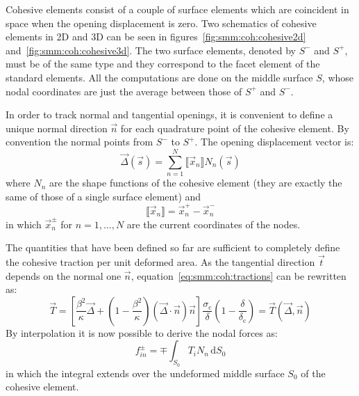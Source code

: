 Cohesive elements consist of a couple of surface elements which are
coincident in space when the opening displacement is zero. Two
schematics of cohesive elements in 2D and 3D can be seen in
figures~\ref{fig:smm:coh:cohesive2d}
and~\ref{fig:smm:coh:cohesive3d}. The two surface elements, denoted by
$S^-$ and $S^+$, must be of the same type and they correspond to the
facet element of the standard elements. All the computations are done
on the middle surface $S$, whose nodal coordinates are just the
average between those of $S^+$ and $S^-$.

In order to track normal and tangential openings, it is convenient to
define a unique normal direction $\vec{n}$ for each quadrature point
of the cohesive element. By convention the normal points from $S^-$ to
$S^+$. The opening displacement vector is:
\begin{equation}
  \label{eq:opening_displacement}
  \vec{\Delta} (\vec{s}) = \sum_{n=1}^N \llbracket \vec{x}_n \rrbracket N_n (\vec s)
\end{equation}
where $N_n$ are the shape functions of the cohesive element (they are
exactly the same of those of a single surface element) and
\begin{equation}
  \label{eq:disp_difference}
  \llbracket \vec{x}_n \rrbracket = \vec{x}_n^+ - \vec{x}_n^-
\end{equation}
in which $\vec{x}_n^\pm$ for $n=1,\dots,N$ are the current coordinates
of the nodes.

The quantities that have been defined so far are sufficient to
completely define the cohesive traction per unit deformed
area. As the tangential direction $\vec{t}$ depends on the normal one
$\vec{n}$, equation~\eqref{eq:smm:coh:tractions} can be rewritten as:
\begin{equation}
  \vec{T} = \left[ \frac{\beta^2}{\kappa} \vec{\Delta} +
    \left( 1- \frac{\beta^2}{\kappa}\right)
    \left( \vec{\Delta} \cdot \vec{n}\right) \vec{n} \right]
  \frac{\sigma_\mathrm{c}}{\delta}
  \left( 1- \frac{\delta}{\delta_\mathrm{c}} \right) =
  \vec{T}(\vec{\Delta}, \vec{n})
\end{equation}
 By interpolation it is now possible to derive the nodal
forces as:
\begin{equation}
  f_{in}^\pm = \mp \int_{S_0} T_i N_n\, \mathrm{d}S_0
\end{equation}
in which the integral extends over the undeformed middle surface $S_0$
of the cohesive element.

